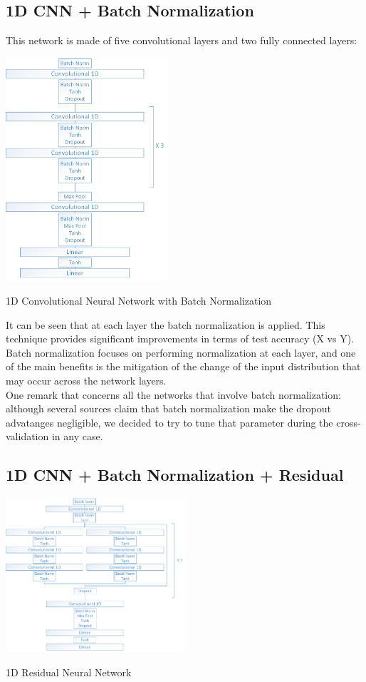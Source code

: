 \documentclass[10pt,conference,compsocconf]{IEEEtran}
\begin{document}
\subsection{1D CNN + Batch Normalization}
This network is made of five convolutional layers and two fully connected layers:

\begin{center}
	\captionsetup{type=figure}
	\includegraphics[width=0.45\textwidth]{img/Conv1DBatchNorm.png}
	\label{fig:Conv2D}
	\caption {1D Convolutional Neural Network with Batch Normalization}
\end{center}

It can be seen that at each layer the batch normalization is applied. This technique provides significant improvements in terms of test accuracy (X vs Y). Batch normalization focuses on performing normalization at each layer, and one of the main benefits is the mitigation of the change of the input distribution that may occur across the network layers. \\%
One remark that concerns all the networks that involve batch normalization: although several sources claim that batch normalization make the dropout advatanges negligible, we decided to try to tune that parameter during the cross-validation in any case.
\subsection{1D CNN + Batch Normalization + Residual}
\begin{center}
	\captionsetup{type=figure}
	\includegraphics[width=0.5\textwidth]{img/Residual1D.png}
	\label{fig:Conv2D}
	\caption {1D Residual Neural Network}
\end{center}
\end{document}
